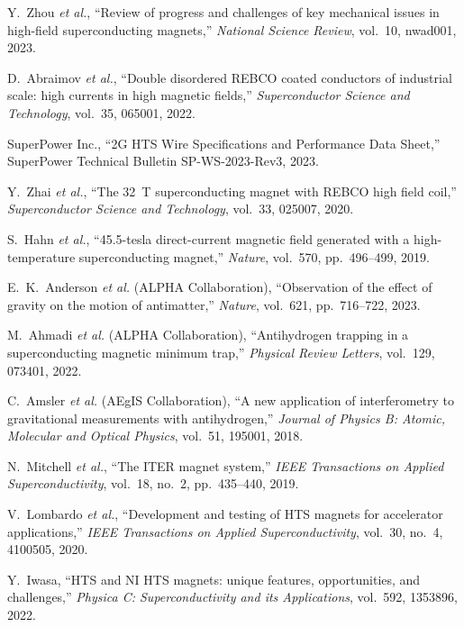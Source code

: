 \documentclass[journal]{IEEEtran}
\begin{document}

\begin{thebibliography}{25}

Y.~Zhou \emph{et al.}, ``Review of progress and challenges of key mechanical issues in high-field superconducting magnets,'' \emph{National Science Review}, vol.~10, nwad001, 2023.

D.~Abraimov \emph{et al.}, ``Double disordered REBCO coated conductors of industrial scale: high currents in high magnetic fields,'' \emph{Superconductor Science and Technology}, vol.~35, 065001, 2022.

SuperPower Inc., ``2G HTS Wire Specifications and Performance Data Sheet,'' SuperPower Technical Bulletin SP-WS-2023-Rev3, 2023.

Y.~Zhai \emph{et al.}, ``The 32~T superconducting magnet with REBCO high field coil,'' \emph{Superconductor Science and Technology}, vol.~33, 025007, 2020.

S.~Hahn \emph{et al.}, ``45.5-tesla direct-current magnetic field generated with a high-temperature superconducting magnet,'' \emph{Nature}, vol.~570, pp.~496--499, 2019.

E.~K.~Anderson \emph{et al.} (ALPHA Collaboration), ``Observation of the effect of gravity on the motion of antimatter,'' \emph{Nature}, vol.~621, pp.~716--722, 2023.

M.~Ahmadi \emph{et al.} (ALPHA Collaboration), ``Antihydrogen trapping in a superconducting magnetic minimum trap,'' \emph{Physical Review Letters}, vol.~129, 073401, 2022.

C.~Amsler \emph{et al.} (AEgIS Collaboration), ``A new application of interferometry to gravitational measurements with antihydrogen,'' \emph{Journal of Physics B: Atomic, Molecular and Optical Physics}, vol.~51, 195001, 2018.

N.~Mitchell \emph{et al.}, ``The ITER magnet system,'' \emph{IEEE Transactions on Applied Superconductivity}, vol.~18, no.~2, pp.~435--440, 2019.

V.~Lombardo \emph{et al.}, ``Development and testing of HTS magnets for accelerator applications,'' \emph{IEEE Transactions on Applied Superconductivity}, vol.~30, no.~4, 4100505, 2020.

Y.~Iwasa, ``HTS and NI HTS magnets: unique features, opportunities, and challenges,'' \emph{Physica C: Superconductivity and its Applications}, vol.~592, 1353896, 2022.


\end{thebibliography}
\end{document}
